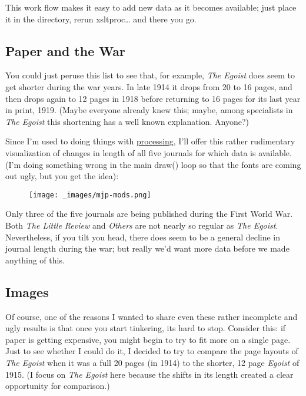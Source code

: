 \documentclass[
  12pt,
]{article}
\begin{document}
This work flow makes it easy to add new data as it becomes available;
just place it in the directory, rerun xsltproc\ldots{} and there you go.

\hypertarget{paper-and-the-war}{%
\subsection{Paper and the War}\label{paper-and-the-war}}

You could just peruse this list to see that, for example, \emph{The
Egoist} does seem to get shorter during the war years. In late 1914 it
drops from 20 to 16 pages, and then drops again to 12 pages in 1918
before returning to 16 pages for its last year in print, 1919. (Maybe
everyone already knew this; maybe, among specialists in \emph{The
Egoist} this shortening has a well known explanation. Anyone?)

Since I'm used to doing things with
\href{http://processing.org}{processing}, I'll offer this rather
rudimentary visualization of changes in length of all five journals for
which data is available. (I'm doing something wrong in the main draw()
loop so that the fonts are coming out ugly, but you get the idea):

\par\begin{figure}\centering\texttt{[image: \_images/mjp-mods.png]}\caption{}\end{figure}

Only three of the five journals are being published during the First
World War. Both \emph{The Little Review} and \emph{Others} are not
nearly so regular as \emph{The Egoist}. Nevertheless, if you tilt you
head, there does seem to be a general decline in journal length during
the war; but really we'd want more data before we made anything of this.

\hypertarget{images}{%
\subsection{Images}\label{images}}

Of course, one of the reasons I wanted to share even these rather
incomplete and ugly results is that once you start tinkering, its hard
to stop. Consider this: if paper is getting expensive, you might begin
to try to fit more on a single page. Just to see whether I could do it,
I decided to try to compare the page layouts of \emph{The Egoist} when
it was a full 20 pages (in 1914) to the shorter, 12 page \emph{Egoist}
of 1915. (I focus on \emph{The Egoist} here because the shifts in its
length created a clear opportunity for comparison.)
\end{document}
